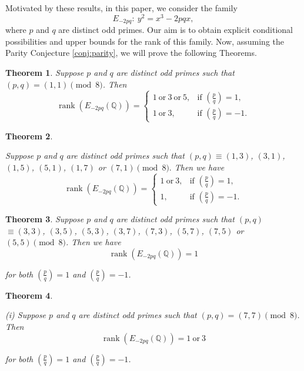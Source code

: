 \documentclass[12pt]{amsart}
\newcommand{\legendre}[2]{\genfrac{(}{)}{}{}{#1}{#2}}
\numberwithin{equation}{section}
\newtheorem{thm}{Theorem}[section]
\theoremstyle{definition}
\begin{document}
Motivated by these results, in this paper, we consider the family
\begin{equation}
\label{eq:1.1}
    E_{-2pq}:~ y^2 = x^3 -2pqx,
\end{equation}where $p$ and $q$ are distinct odd primes. Our aim is to obtain
explicit conditional possibilities and upper bounds for the rank of this family.
Now, assuming the Parity Conjecture \ref{conj:parity}, we will prove the following Theorems.




\begin{thm}
    \label{thm:1.1} Suppose $p$ and $q$ are distinct odd primes such that $(p,q)= (1,1) \pmod 8 $.  Then 
  $$
\operatorname{rank}(E_{-2pq}(\mathbb{Q}))=
\begin{cases}
1 \ \text{or}\ 3 \ \text{or}\ 5, & \text{if } \legendre{p}{q}=1,~~ \\
1 \ \text{or}\ 3, & \text{if }  \legendre{p}{q}=-1.
\end{cases}
$$
\end{thm}


\begin{thm}
    \label{thm:1.2} 
    
 
 Suppose $p$ and $q$ are distinct odd primes such that $(p,q) \equiv (1,3)$, $(3,1)$, $(1,5)$,  $(5,1)$, $(1,7)$ or $(7,1)\pmod 8.$ Then   we have
$$
\operatorname{rank}(E_{-2pq}(\mathbb{Q}))=
\begin{cases}
1 \ \text{or}\ 3, & \text{if } \legendre{p}{q}=1,~~ \\
1, & \text{if }  \legendre{p}{q}=-1.
\end{cases}$$

\end{thm}

\begin{thm}
    \label{thm:1.3} 
 Suppose $p$ and $q$ are distinct odd primes such that $(p,q)$ $\equiv  (3,3)$, $(3,5)$, $(5,3)$, $(3,7)$, $(7,3)$, $(5,7)$, $(7,5)$ or $(5,5) \pmod 8 $.  Then we have
  $$
\operatorname{rank}(E_{-2pq}(\mathbb{Q}))= 1
$$

for both $\legendre{p}{q}=1$ and $\legendre{p}{q}=-1$.

\end{thm}

\begin{thm}
    \label{thm:1.4} 
    
 \noindent  (i) Suppose $p$ and $q$ are distinct odd primes such that $(p,q)= (7,7) \pmod 8 $.   Then 
  $$
\operatorname{rank}(E_{-2pq}(\mathbb{Q}))= 1 \ \text{or}\ 3
$$

for both $\legendre{p}{q}=1$ and $\legendre{p}{q}=-1$.
\end{thm}
\end{document}

